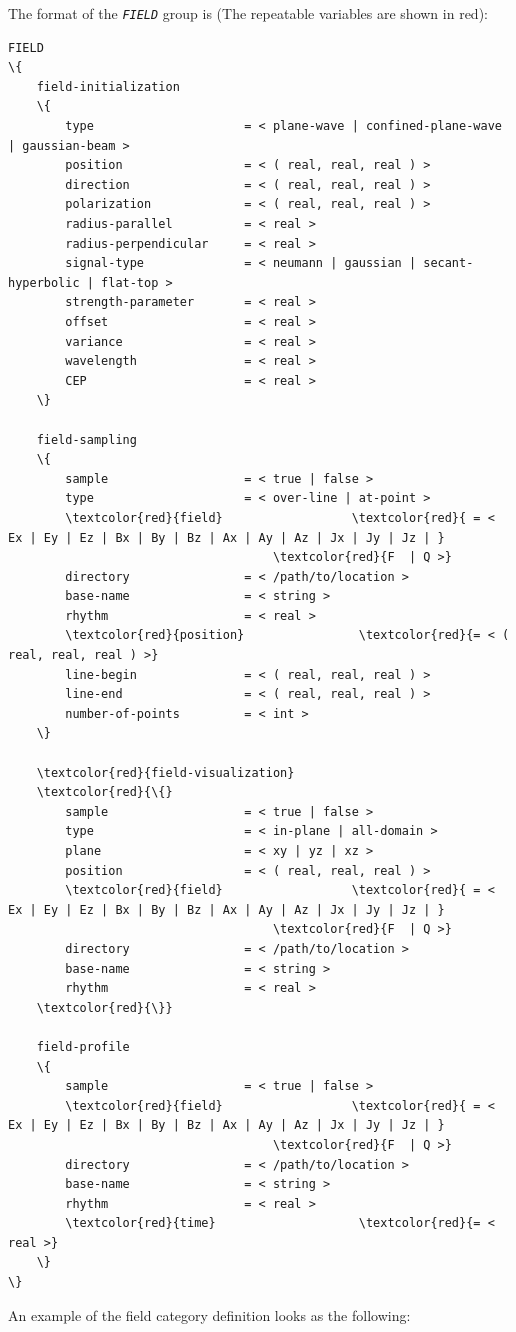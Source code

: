 The format of the {\tt \small \em FIELD} group is (The repeatable variables are shown in red):
%
\begin{Verbatim}[frame=single, fontsize=\small, tabsize=4, fontfamily=courier, fontseries=b, commandchars=\\\{\}, obeytabs]
FIELD
\{
	field-initialization
	\{
		type  					 = < plane-wave | confined-plane-wave | gaussian-beam >
		position  				 = < ( real, real, real ) >
		direction  				 = < ( real, real, real ) >
		polarization  			 = < ( real, real, real ) >
		radius-parallel  		 = < real >
		radius-perpendicular  	 = < real >
		signal-type  			 = < neumann | gaussian | secant-hyperbolic | flat-top >
		strength-parameter  	 = < real >
		offset  				 = < real >
		variance  				 = < real >
		wavelength  			 = < real >
		CEP  					 = < real >
	\}

	field-sampling
	\{
		sample  				 = < true | false >
		type  					 = < over-line | at-point >
		\textcolor{red}{field} 					\textcolor{red}{ = < Ex | Ey | Ez | Bx | By | Bz | Ax | Ay | Az | Jx | Jy | Jz | }
									 \textcolor{red}{F  | Q >}
		directory  				 = < /path/to/location >
		base-name  				 = < string >
		rhythm  				 = < real >
		\textcolor{red}{position}  				 \textcolor{red}{= < ( real, real, real ) >}
		line-begin  			 = < ( real, real, real ) >
		line-end  				 = < ( real, real, real ) >
		number-of-points  		 = < int >
	\}

	\textcolor{red}{field-visualization}
	\textcolor{red}{\{}
		sample  				 = < true | false >
		type					 = < in-plane | all-domain >
		plane					 = < xy | yz | xz >
		position  				 = < ( real, real, real ) >
		\textcolor{red}{field} 					\textcolor{red}{ = < Ex | Ey | Ez | Bx | By | Bz | Ax | Ay | Az | Jx | Jy | Jz | }
									 \textcolor{red}{F  | Q >}
		directory  				 = < /path/to/location >
		base-name  				 = < string >
		rhythm  				 = < real >
	\textcolor{red}{\}}

	field-profile
	\{
		sample  				 = < true | false >
		\textcolor{red}{field} 					\textcolor{red}{ = < Ex | Ey | Ez | Bx | By | Bz | Ax | Ay | Az | Jx | Jy | Jz | }
									 \textcolor{red}{F  | Q >}
		directory  				 = < /path/to/location >
		base-name  				 = < string >
		rhythm  				 = < real >
		\textcolor{red}{time}  					 \textcolor{red}{= < real >}
	\}
\}
\end{Verbatim}
%
An example of the field category definition looks as the following:
%
